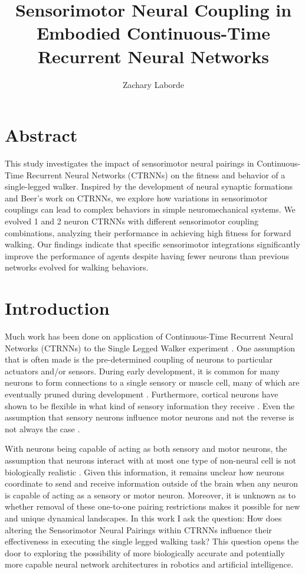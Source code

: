 \documentclass{article}
\title{Sensorimotor Neural Coupling in Embodied Continuous-Time Recurrent Neural Networks}
\author{Zachary Laborde}
\begin{document}
\maketitle

\section{Abstract}

This study investigates the impact of sensorimotor neural pairings in Continuous-Time Recurrent Neural Networks (CTRNNs) on the fitness and behavior of a single-legged walker. Inspired by the development of neural synaptic formations and Beer's work on CTRNNs, we explore how variations in sensorimotor couplings can lead to complex behaviors in simple neuromechanical systems. We evolved 1 and 2 neuron CTRNNs with different sensorimotor coupling combinations, analyzing their performance in achieving high fitness for forward walking. Our findings indicate that specific sensorimotor integrations significantly improve the performance of agents despite having fewer neurons than previous networks evolved for walking behaviors.

\section{Introduction}
Much work has been done on application of Continuous-Time Recurrent Neural Networks (CTRNNs) to the Single Legged Walker experiment \cite{BeerWalker}. One assumption that is often made is the pre-determined coupling of neurons to particular actuators and/or sensors. During early development, it is common for many neurons to form connections to a single sensory or muscle cell, many of which are eventually pruned during development \cite{AxonPruning}. Furthermore, cortical neurons have shown to be flexible in what kind of sensory information they receive \cite{Ferret}. Even the assumption that sensory neurons influence motor neurons and not the reverse is not always the case \cite{CorollaryDischarge}.

With neurons being capable of acting as both sensory and motor neurons, the assumption that neurons interact with at most one type of non-neural cell is not biologically realistic \cite{CETouch}. Given this information, it remains unclear how neurons coordinate to send and receive information outside of the brain when any neuron is capable of acting as a sensory or motor neuron. Moreover, it is unknown as to whether removal of these one-to-one pairing restrictions makes it possible for new and unique dynamical landscapes. In this work I ask the question: How does altering the Sensorimotor Neural Pairings within CTRNNs influence their effectiveness in executing the single legged walking task? This question opens the door to exploring the possibility of more biologically accurate and potentially more capable neural network architectures in robotics and artificial intelligence.
\end{document}
